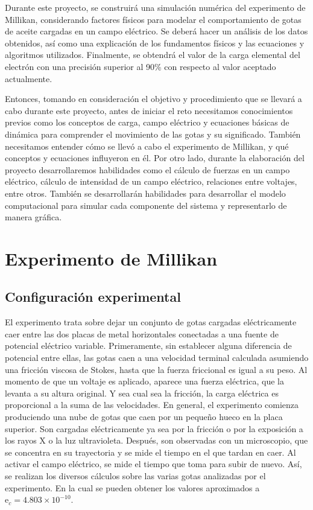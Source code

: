 \documentclass[
 reprint,
 amsmath,amssymb,
 aps,
]{revtex4-2}
\begin{document}
Durante este proyecto, se construirá una simulación numérica del experimento de Millikan, considerando factores físicos para modelar el comportamiento de gotas de aceite cargadas en un campo eléctrico. Se deberá hacer un análisis de los datos obtenidos, así como una explicación de los fundamentos físicos y las ecuaciones y algoritmos utilizados. Finalmente, se obtendrá el valor de la carga elemental del electrón con una precisión superior al 90\% con respecto al valor aceptado actualmente.

Entonces, tomando en consideración el objetivo y procedimiento que se llevará a cabo durante este proyecto, antes de iniciar el reto necesitamos conocimientos previos como los conceptos de carga, campo eléctrico y ecuaciones básicas de dinámica para comprender el movimiento de las gotas y su significado. También necesitamos entender cómo se llevó a cabo el experimento de Millikan, y qué conceptos y ecuaciones influyeron en él. Por otro lado, durante la elaboración del proyecto desarrollaremos habilidades como el cálculo de fuerzas en un campo eléctrico, cálculo de intensidad de un campo eléctrico, relaciones entre voltajes, entre otros. También se desarrollarán habilidades para desarrollar el modelo computacional para simular cada componente del sistema y representarlo de manera gráfica. 

\section{\label{sec:level2}Experimento de Millikan}

\subsection{\label{sec:citeref}Configuración experimental}

El experimento trata sobre dejar un conjunto de gotas cargadas eléctricamente caer entre las dos placas de metal horizontales conectadas a una fuente de potencial eléctrico variable. Primeramente, sin establecer alguna diferencia de potencial entre ellas, las gotas caen a una velocidad terminal calculada asumiendo una fricción viscosa de Stokes, hasta que la fuerza friccional es igual a su peso. Al momento de que un voltaje es aplicado, aparece una fuerza eléctrica, que la levanta a su altura original. Y sea cual sea la fricción, la carga eléctrica es proporcional  a la suma de las velocidades.
En general, el experimento comienza produciendo una nube de gotas que caen por un pequeño hueco en la placa superior. Son cargadas eléctricamente ya sea por la fricción o por la exposición a los rayos X o la luz ultravioleta. Después, son observadas con un microscopio, que se concentra en su trayectoria y se mide el tiempo en el que tardan en caer. Al activar el campo eléctrico, se mide el tiempo que toma para subir de nuevo. Así, se realizan los diversos cálculos sobre las varias gotas analizadas por el experimento. En la cual se pueden obtener los valores aproximados a $\text{e}_c=4.803\times 10^{-10}$.\cite{hector2020}
\end{document}
